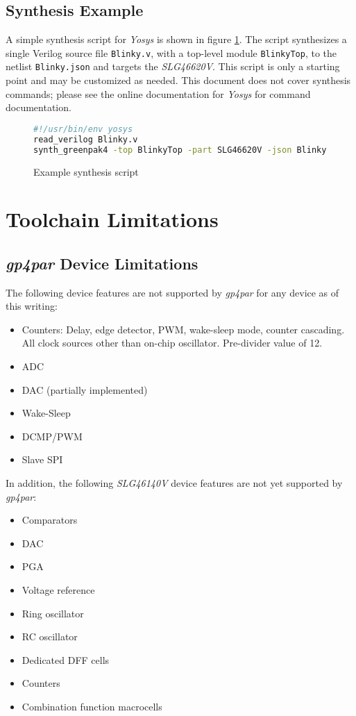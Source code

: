\documentclass[11pt]{article}
\newcommand{\namestyle}[1]{\textit{#1}}
\begin{document}
\subsection{Synthesis Example}

A simple synthesis script for \namestyle{Yosys} is shown in figure \ref{yscript}. The script synthesizes a single
Verilog source file \texttt{Blinky.v}, with a top-level module \texttt{BlinkyTop}, to the netlist \texttt{Blinky.json}
and targets the \namestyle{SLG46620V}. This script is only a starting point and may be customized as needed. This
document does not cover synthesis commands; please see the online documentation for \namestyle{Yosys} for command
documentation.

\begin{figure}[h]
\begin{lstlisting}[language=sh]
#!/usr/bin/env yosys
read_verilog Blinky.v
synth_greenpak4 -top BlinkyTop -part SLG46620V -json Blinky.json
\end{lstlisting}
\caption{Example synthesis script}
\label{yscript}
\end{figure}

\pagebreak
\section{Toolchain Limitations}
\subsection{\namestyle{gp4par} Device Limitations}

The following device features are not supported by \namestyle{gp4par} for any device as of this writing:

\begin{itemize}
\item Counters: Delay, edge detector, PWM, wake-sleep mode, counter cascading.
All clock sources other than on-chip oscillator. Pre-divider value of 12.
\item ADC
\item DAC (partially implemented)
\item Wake-Sleep
\item DCMP/PWM
\item Slave SPI
\end{itemize}

In addition, the following \namestyle{SLG46140V} device features are not yet supported by \namestyle{gp4par}:

\begin{itemize}
\item Comparators
\item DAC
\item PGA
\item Voltage reference
\item Ring oscillator
\item RC oscillator
\item Dedicated DFF cells
\item Counters
\item Combination function macrocells
\end{itemize}
\end{document}
